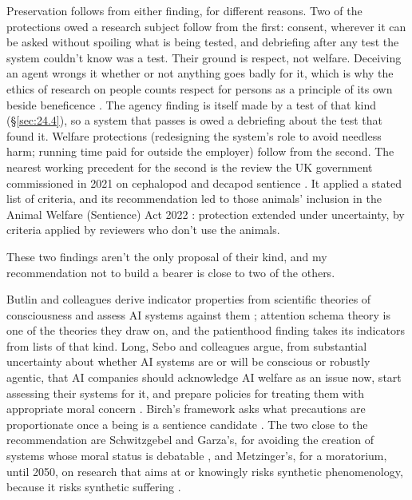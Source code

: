 Preservation follows from either finding, for different reasons. Two of the protections owed a research subject follow from the first: consent, wherever it can be asked without spoiling what is being tested, and debriefing after any test the system couldn't know was a test. Their ground is respect, not welfare. Deceiving an agent wrongs it whether or not anything goes badly for it, which is why the ethics of research on people counts respect for persons as a principle of its own beside beneficence \autocite{belmont1979}. The agency finding is itself made by a test of that kind (\S\ref{sec:24.4}), so a system that passes is owed a debriefing about the test that found it. Welfare protections (redesigning the system's role to avoid needless harm; running time paid for outside the employer) follow from the second. The nearest working precedent for the second is the review the UK government commissioned in 2021 on cephalopod and decapod sentience \autocite{Birch2021CephalopodDecapod}. It applied a stated list of criteria, and its recommendation led to those animals' inclusion in the Animal Welfare (Sentience) Act 2022 \autocite[s.~5]{UK2022AnimalWelfareSentienceAct}: protection extended under uncertainty, by criteria applied by reviewers who don't use the animals.

These two findings aren't the only proposal of their kind, and my recommendation not to build a bearer is close to two of the others.

Butlin and colleagues derive indicator properties from scientific theories of consciousness and assess AI systems against them \autocite{butlin2023consciousness}; attention schema theory is one of the theories they draw on, and the patienthood finding takes its indicators from lists of that kind. Long, Sebo and colleagues argue, from substantial uncertainty about whether AI systems are or will be conscious or robustly agentic, that AI companies should acknowledge AI welfare as an issue now, start assessing their systems for it, and prepare policies for treating them with appropriate moral concern \autocite{long2024taking}. Birch's framework asks what precautions are proportionate once a being is a sentience candidate \autocite{birch2024edge}. The two close to the recommendation are Schwitzgebel and Garza's, for avoiding the creation of systems whose moral status is debatable \autocite{schwitzgebel2015defense}, and Metzinger's, for a moratorium, until 2050, on research that aims at or knowingly risks synthetic phenomenology, because it risks synthetic suffering \autocite{metzinger2021suffering}.

